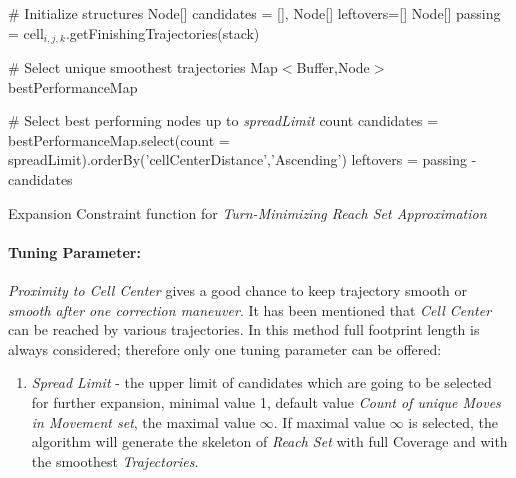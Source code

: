 \begin{algorithm}[H]
    
    \BlankLine
    \# Initialize structures\;
    Node[] candidates = [], Node[] leftovers=[]\;
    Node[] passing = cell$_{i,j,k}$.getFinishingTrajectories(stack)\;
    
    \BlankLine
    \# Select unique smoothest trajectories\;
    Map$<$Buffer,Node$>$  bestPerformanceMap\;
    \For{Node test $\in$ passing}{
        centerDistance= test.getPerformance(cell$_{i,j,k}$)]\;
        footPrint = test.getFootprint()\;
        \eIf{bestPerformanceMap.contains(footPrint)}{
            old = bestPerformanceMap.getByKey(footprint)\;
            oldPerformance= old.getPerformance(cell$_{i,j,k}$)\;
            \If{oldPerformance $>$ centerDistance}{
                bestPerformanceMap.setByKey(footprint,test)\;         
            }
        }{
            bestPerformanceMap.setByKey(footprint,test)\;
        }
    }
    
    \BlankLine
    \# Select best performing nodes up to \emph{spreadLimit} count\;
    candidates = bestPerformanceMap.select(count = spreadLimit).orderBy('cellCenterDistance','Ascending')\;
    leftovers = passing - candidates\;
    
    
    \caption{Expansion Constraint function for \emph{Turn-Minimizing Reach Set Approximation}}
    \label{alg:ExpansionConstraintFunctionForHarmonicReachSet}    
\end{algorithm}


\paragraph{Tuning Parameter:} \emph{Proximity to Cell Center} gives a good chance to keep trajectory smooth or \emph{smooth after one correction maneuver}. It has been mentioned that \emph{Cell Center} can be reached by various trajectories. In this method full footprint length is always considered; therefore only one tuning parameter can be offered:
\begin{enumerate}
    \item \emph{Spread Limit} - the upper limit of candidates which are going to be selected for further expansion, minimal value 1, default value \emph{Count of unique Moves in Movement set}, the maximal value $\infty$. If maximal value $\infty$ is selected, the algorithm will generate the skeleton of \emph{Reach Set} with full Coverage and with the smoothest \emph{Trajectories}.
\end{enumerate}

